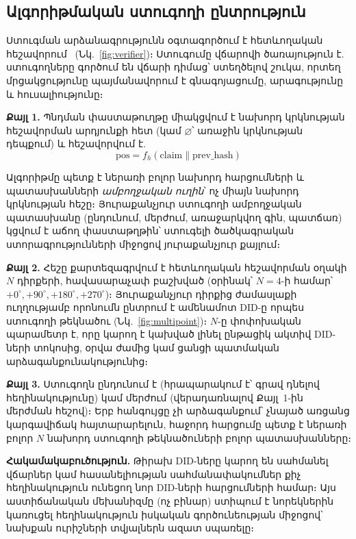 \documentclass[11pt,a4paper,twocolumn]{article}
\begin{document}
\subsection{Ալգորիթմական ստուգողի ընտրություն}

Ստուգման արձանագրությունն օգտագործում է հետևողական հեշավորում~\cite{karger1997} (Նկ.~\ref{fig:verifier})։ Ստուգումը վճարովի ծառայություն է. ստուգողները գործում են վճարի դիմաց՝ ստեղծելով շուկա, որտեղ մրցակցությունը պայմանավորում է գնագոյացումը, արագությունը և հուսալիությունը։

\textbf{Քայլ 1.} Պնդման փաստաթուղթը միակցվում է նախորդ կրկնության հեշավորման արդյունքի հետ (կամ $\varnothing$՝ առաջին կրկնության դեպքում) և հեշավորվում է.
\begin{equation}
\text{pos} = f_h(\text{claim} \| \text{prev\_hash})
\label{eq:hash}
\end{equation}

Ալգորիթմը պետք է ներառի բոլոր նախորդ հարցումների և պատասխանների \emph{ամբողջական ուղին}՝ ոչ միայն նախորդ կրկնության հեշը։ Յուրաքանչյուր ստուգողի ամբողջական պատասխանը (ընդունում, մերժում, առաջարկվող գին, պատճառ) կցվում է աճող փաստաթղթին՝ ստուգելի ծածկագրական ստորագրությունների միջոցով յուրաքանչյուր քայլում։

\textbf{Քայլ 2.} Հեշը քարտեզագրվում է հետևողական հեշավորման օղակի $N$ դիրքերի, հավասարաչափ բաշխված (օրինակ՝ $N=4$-ի համար՝ $+0^{\circ}, +90^{\circ}, +180^{\circ}, +270^{\circ}$)։ Յուրաքանչյուր դիրքից ժամասլաքի ուղղությամբ որոնումն ընտրում է ամենամոտ DID-ը որպես ստուգողի թեկնածու (Նկ.~\ref{fig:multipoint})։ $N$-ը փոփոխական պարամետր է, որը կարող է կախված լինել ընթացիկ ակտիվ DID-ների տոկոսից, օրվա ժամից կամ ցանցի պատմական արձագանքունակությունից։

\textbf{Քայլ 3.} Ստուգողն ընդունում է (հրապարակում է՝ գրավ դնելով հեղինակությունը) կամ մերժում (վերադառնալով Քայլ~1-ին մերժման հեշով)։ Երբ հանգույցը չի արձագանքում՝ չնայած առցանց կարգավիճակ հայտարարելուն, հաջորդ հարցումը պետք է ներառի բոլոր $N$ նախորդ ստուգողի թեկնածուների բոլոր պատասխանները։

\textbf{Հակամակաբուծություն.} Թիրախ DID-ները կարող են սահմանել վճարներ կամ հասանելիության սահմանափակումներ քիչ հեղինակություն ունեցող նոր DID-ների հարցումների համար։ Այս աստիճանական մեխանիզմը (ոչ բինար) ստիպում է նորեկներին կառուցել հեղինակություն իսկական գործունեության միջոցով՝ նախքան ուրիշների տվյալներն ազատ սպառելը։
\end{document}
